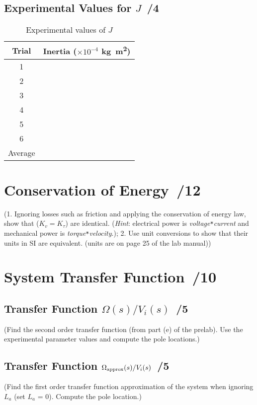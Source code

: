 \documentclass{article}
\newcommand{\score}{\hfill \underline{\hspace{0.65cm}}\,/} %
\begin{document}
\subsection{Experimental Values for $J$ \score 4}
\begin{table}[phtb] 
\begin{center}
\caption{Experimental values of $J$}
\label{fig:lab4_q5}
\begin{tabular}{c|l}\hline \hline
\cellcolor{lightgray} Trial & \cellcolor{lightgray} Inertia ($\times10^{-4}$ \si{\kg\m\squared}) \\
\hline
1 &  \\ \hline
2 &  \\ \hline
3 &  \\ \hline
4 &  \\ \hline
5 &  \\ \hline
6 &  \\ \hline
Average &  \\ \hline
\end{tabular}
\end{center}
\end{table}

\section{Conservation of Energy \score 12}
(1. Ignoring losses such as friction and applying the conservation of energy law, show that ($K_v=K_{\tau}$) are identical. (\emph{Hint}: electrical power is \emph{voltage}\verb|*|\emph{current} and mechanical power is \emph{torque}\verb|*|\emph{velocity}.); 2. Use unit conversions to show that their units in SI are equivalent. (units are on page 25 of the lab manual))

\section{System Transfer Function \score 10}
\subsection{Transfer Function $\Omega(s)/V_i(s)$ \score 5}
(Find the second order transfer function (from part (e) of the prelab). Use the experimental parameter values and compute the pole locations.)

\subsection{Transfer Function $\Omega_{\rm approx}(s)/V_i(s)$ \score 5}
(Find the first order transfer function approximation of the system when ignoring $L_a$ (set $L_a$ = 0). Compute the pole location.)
\end{document}
